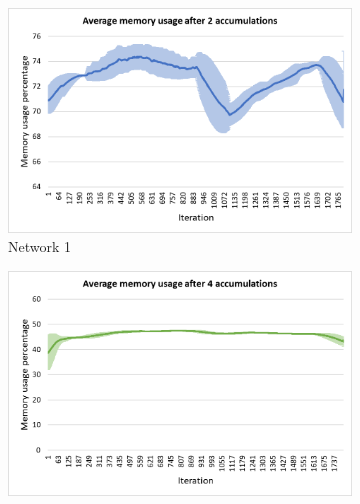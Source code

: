 \documentclass[USenglish]{uit-thesis}
\begin{document}




\begin{figure}
        \centering
        \begin{subfigure}[b]{0.475\textwidth}
            \centering
            \includegraphics[width=\textwidth]{Mem_stdev_2.png}
            \caption[Network1]%
            {{\small Network 1}}    
            \label{fig:memfig1}
        \end{subfigure}
        \hfill
        \begin{subfigure}[b]{0.475\textwidth}  
            \centering 
            \includegraphics[width=\textwidth]{Mem_stdev_4.png}

\end{subfigure}
\end{figure}
\end{document}
